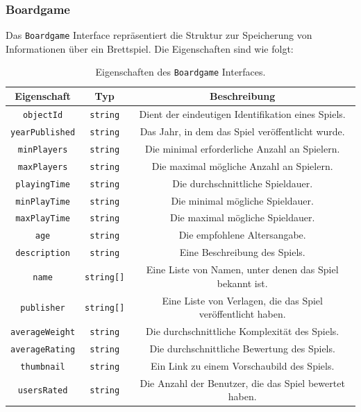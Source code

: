 \subsubsection{Boardgame}
Das \texttt{Boardgame} Interface repräsentiert die Struktur zur Speicherung von Informationen über ein
Brettspiel. Die Eigenschaften sind wie folgt:
\begin{table}[H]
    \centering
    \begin{tabular}{|c|c|c|}
        \hline
        \textbf{Eigenschaft} & \textbf{Typ} & \textbf{Beschreibung} \\
        \hline
        \texttt{objectId} & \texttt{string} & Dient der eindeutigen Identifikation eines Spiels. \\
        \texttt{yearPublished} & \texttt{string} & Das Jahr, in dem das Spiel veröffentlicht wurde. \\
        \texttt{minPlayers} & \texttt{string} & Die minimal erforderliche Anzahl an Spielern. \\
        \texttt{maxPlayers} & \texttt{string} & Die maximal mögliche Anzahl an Spielern. \\
        \texttt{playingTime} & \texttt{string} & Die durchschnittliche Spieldauer. \\
        \texttt{minPlayTime} & \texttt{string} & Die minimal mögliche Spieldauer. \\
        \texttt{maxPlayTime} & \texttt{string} & Die maximal mögliche Spieldauer. \\
        \texttt{age} & \texttt{string} & Die empfohlene Altersangabe. \\
        \texttt{description} & \texttt{string} & Eine Beschreibung des Spiels. \\
        \texttt{name} & \texttt{string[]} & Eine Liste von Namen, unter denen das Spiel bekannt ist. \\
        \texttt{publisher} & \texttt{string[]} & Eine Liste von Verlagen, die das Spiel veröffentlicht haben. \\
        \texttt{averageWeight} & \texttt{string} & Die durchschnittliche Komplexität des Spiels. \\
        \texttt{averageRating} & \texttt{string} & Die durchschnittliche Bewertung des Spiels. \\
        \texttt{thumbnail} & \texttt{string} & Ein Link zu einem Vorschaubild des Spiels. \\
        \texttt{usersRated} & \texttt{string} & Die Anzahl der Benutzer, die das Spiel bewertet haben. \\
        \hline
    \end{tabular}
    \caption{Eigenschaften des \texttt{Boardgame} Interfaces.}
    \label{tab:boardgame}
\end{table}


